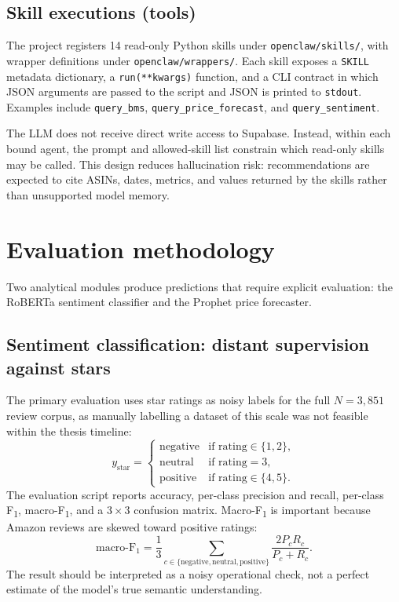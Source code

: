 \subsection{Skill executions (tools)}

The project registers 14 read-only Python skills under
\texttt{openclaw/skills/}, with wrapper definitions under
\texttt{openclaw/wrappers/}. Each skill exposes a \texttt{SKILL}
metadata dictionary, a \texttt{run(**kwargs)} function, and a CLI
contract in which JSON arguments are passed to the script and JSON is
printed to \texttt{stdout}. Examples include \texttt{query\_bms},
\texttt{query\_price\_forecast}, and \texttt{query\_sentiment}.

The LLM does not receive direct write access to Supabase. Instead, within
each bound agent, the prompt and allowed-skill list constrain which
read-only skills may be called. This design reduces hallucination risk:
recommendations are expected to cite ASINs, dates, metrics, and values
returned by the skills rather than unsupported model memory.

\section{Evaluation methodology}
\label{sec:eval}

Two analytical modules produce predictions that require explicit
evaluation: the RoBERTa sentiment classifier and the Prophet price
forecaster.

\subsection{Sentiment classification: distant supervision against stars}

The primary evaluation uses star ratings as noisy labels for the full $N = 3{,}851$ review corpus, as manually labelling a dataset of this scale was not feasible within the thesis timeline:
\begin{equation}
  \label{eq:star_proxy}
  y_{\text{star}} = \begin{cases}
    \text{negative} & \text{if rating} \in \{1, 2\}, \\
    \text{neutral}  & \text{if rating} = 3, \\
    \text{positive} & \text{if rating} \in \{4, 5\}.
  \end{cases}
\end{equation}
The evaluation script reports accuracy, per-class precision and recall,
per-class F\textsubscript{1}, macro-F\textsubscript{1}, and a
$3 \times 3$ confusion matrix. Macro-F\textsubscript{1} is important
because Amazon reviews are skewed toward positive ratings:
\begin{equation}
  \text{macro-F}_1 = \frac{1}{3}
  \sum_{c \in \{\text{negative}, \text{neutral}, \text{positive}\}}
    \frac{2 P_c R_c}{P_c + R_c}.
\end{equation}
The result should be interpreted as a noisy operational check, not a
perfect estimate of the model's true semantic understanding.

